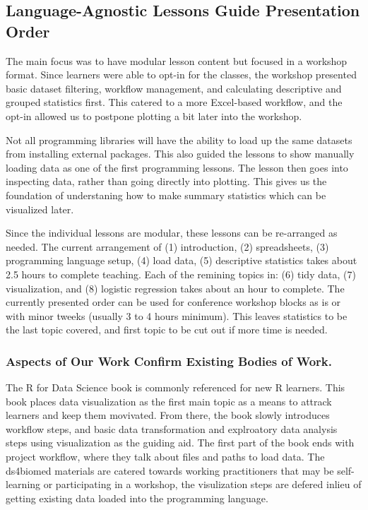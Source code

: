 \documentclass[020-persona_validation.tex]{subfiles}
\begin{document}
    \subsection{Language-Agnostic Lessons Guide Presentation Order}

        The main focus was to have modular lesson content but focused in a workshop format.
        Since learners were able to opt-in for the classes,
        the workshop presented basic dataset filtering, workflow management, and calculating descriptive and grouped statistics first.
        This catered to a more Excel-based workflow,
        and the opt-in allowed us to postpone plotting a bit later into the workshop.

        Not all programming libraries will have the ability to load up the same datasets from installing external packages.
        This also guided the lessons to show manually loading data as one of the first programming lessons.
        The lesson then goes into inspecting data, rather than going directly into plotting.
        This gives us the foundation of understaning how to make summary statistics which can be visualized later.

        Since the individual lessons are modular, these lessons can be re-arranged as needed.
        The current arrangement of
        (1) introduction,
        (2) spreadsheets,
        (3) programming language setup,
        (4) load data,
        (5) descriptive statistics
        takes about 2.5 hours to complete teaching.
        Each of the remining topics in:
        (6) tidy data,
        (7) visualization, and
        (8) logistic regression
        takes about an hour to complete.
        The currently presented order can be used for conference workshop blocks as is or with minor tweeks (usually 3 to 4 hours minimum).
        This leaves statistics to be the last topic covered, and first topic to be cut out if more time is needed.

        \subsubsection{Aspects of Our Work Confirm Existing Bodies of Work.}

            The R for Data Science book is commonly referenced for new R learners.
            This book places data visualization as the first main topic as a means to attrack learners and keep them movivated.
            From there, the book slowly introduces workflow steps, and basic data transformation and explroatory data analysis
            steps using visualization as the guiding aid.
            The first part of the book ends with project workflow, where they talk about files and paths to load data.
            The ds4biomed materials are catered towards working practitioners that may be self-learning or participating in a workshop,
            the visulization steps are defered inlieu of getting existing data loaded into the programming language.
\end{document}
